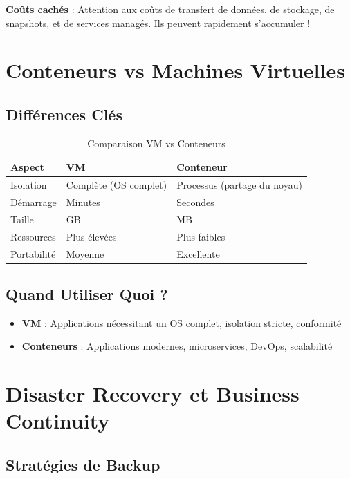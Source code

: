 \documentclass[11pt,a4paper]{article}
\begin{document}
\begin{dangerbox}
\textbf{Coûts cachés} : Attention aux coûts de transfert de données, de stockage, de snapshots, et de services managés. Ils peuvent rapidement s'accumuler !
\end{dangerbox}

\section{Conteneurs vs Machines Virtuelles}

\subsection{Différences Clés}

\begin{table}[h]
\centering
\begin{tabular}{|l|l|l|}
\hline
\textbf{Aspect} & \textbf{VM} & \textbf{Conteneur} \\
\hline
Isolation & Complète (OS complet) & Processus (partage du noyau) \\
Démarrage & Minutes & Secondes \\
Taille & GB & MB \\
Ressources & Plus élevées & Plus faibles \\
Portabilité & Moyenne & Excellente \\
\hline
\end{tabular}
\caption{Comparaison VM vs Conteneurs}
\end{table}

\subsection{Quand Utiliser Quoi ?}

\begin{itemize}
    \item \textbf{VM} : Applications nécessitant un OS complet, isolation stricte, conformité
    \item \textbf{Conteneurs} : Applications modernes, microservices, DevOps, scalabilité
\end{itemize}

\section{Disaster Recovery et Business Continuity}

\subsection{Stratégies de Backup}
\end{document}
